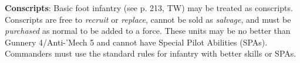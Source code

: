 \item {\bfseries Conscripts}: Basic foot infantry (see p. 213, TW) may be treated as conscripts.
Conscripts are free to \emph{recruit} or \emph{replace}, cannot be sold as \emph{salvage}, and must be \emph{purchased} as normal to be added to a force.
These units may be no better than Gunnery 4/Anti-'Mech 5 and cannot have Special Pilot Abilities (SPAs).
Commanders must use the standard rules for infantry with better skills or SPAs.
